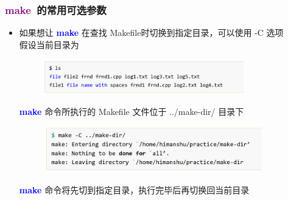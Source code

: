 \frame
{
	\frametitle{\textcolor{purple}{\textbf{make}}~的常用可选参数}
	\begin{itemize}
\item 如果想让 \textcolor{blue}{\textbf{make}} 在查找 \textrm{Makefile}时切换到指定目录，可以使用 \textrm{-C} 选项\\
\vskip 5pt
	假设当前目录为
\begin{figure}[h!]
	\vskip -4pt
\centering
\includegraphics[height=0.6in,clip]{Figures/Make_Makefile_9-1.png}
\label{Fig:Make_Makefile_9-1}
\end{figure}

\textcolor{blue}{\textbf{make}} 命令所执行的 \textrm{Makefile} 文件位于 \textrm{../make-dir/} 目录下
\begin{figure}[h!]
	\vskip -12pt
\centering
\includegraphics[height=0.8in,clip]{Figures/Make_Makefile_9-2.png}
\label{Fig:Make_Makefile_9-2}
\end{figure}
	 \textcolor{blue}{\textbf{make}} 命令将先切到指定目录，执行完毕后再切换回当前目录
	\end{itemize}
}

